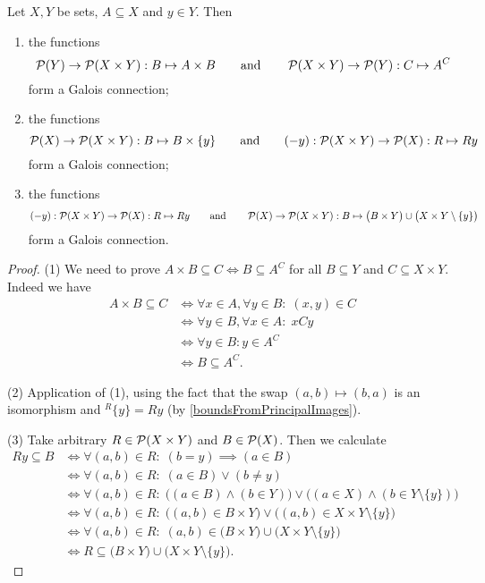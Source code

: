\begin{proposition} \label{productGaloisConnections}
Let $X,Y$ be sets, $A\subseteq X$ and $y\in Y$. Then
\begin{enumerate}
\item the functions
\[ \operatorname{\mathcal{P}}(Y)\to \operatorname{\mathcal{P}}(X\times Y): B \mapsto A\times B \qquad\text{and}\qquad \operatorname{\mathcal{P}}(X\times Y)\to \operatorname{\mathcal{P}}(Y): C\mapsto A^C \]
form a Galois connection;
\item the functions
\[ \operatorname{\mathcal{P}}(X)\to \operatorname{\mathcal{P}}(X\times Y): B \mapsto B\times \{y\} \qquad\text{and}\qquad (-y): \operatorname{\mathcal{P}}(X\times Y)\to \operatorname{\mathcal{P}}(X): R\mapsto Ry \]
form a Galois connection;
\item the functions
\[ (-y):\operatorname{\mathcal{P}}(X\times Y) \to \operatorname{\mathcal{P}}(X): R\mapsto Ry \qquad\text{and}\qquad \operatorname{\mathcal{P}}(X)\to \operatorname{\mathcal{P}}(X\times Y): B\mapsto \big(B\times Y\big) \cup \big(X\times Y\setminus\{y\}\big) \]
form a Galois connection.
\end{enumerate}
\end{proposition}
\begin{proof}
(1) We need to prove $A\times B \subseteq C \iff B\subseteq A^C$ for all $B\subseteq Y$ and $C\subseteq X\times Y$. Indeed we have
\begin{align*}
A\times B \subseteq C &\iff \forall x\in A, \forall y\in B: \; (x,y)\in C \\
&\iff \forall y\in B, \forall x\in A: \; xCy \\
&\iff \forall y\in B: y\in A^C \\
&\iff B \subseteq A^C.
\end{align*}

(2) Application of (1), using the fact that the swap $(a,b)\mapsto (b,a)$ is an isomorphism and $^R\{y\} = Ry$ (by \ref{boundsFromPrincipalImages}).

(3) Take arbitrary $R\in \operatorname{\mathcal{P}}(X\times Y)$ and $B\in \operatorname{\mathcal{P}}(X)$. Then we calculate
\begin{align*}
Ry \subseteq B &\iff \forall (a,b)\in R: \; (b=y) \implies (a\in B) \\
&\iff \forall (a,b)\in R: \; (a\in B) \lor (b\neq y) \\
&\iff \forall (a,b)\in R: \; \Big((a\in B)\land (b\in Y)\Big) \lor \Big((a\in X)\land(b\in Y\setminus\{y\})\Big) \\
&\iff \forall (a,b)\in R: \; \big((a,b)\in B\times Y\big) \lor \big((a,b)\in X\times Y\setminus\{y\}\big) \\
&\iff \forall (a,b)\in R: \; (a,b)\in \big(B\times Y\big) \cup \big(X\times Y\setminus\{y\}\big) \\
&\iff R \subseteq \big(B\times Y\big) \cup \big(X\times Y\setminus\{y\}\big).
\end{align*}
\end{proof}

